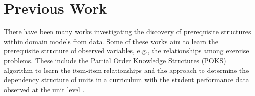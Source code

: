 \documentclass{edm_template}
\begin{document}
%


\section{Previous Work}
\label{sec:previous_work}
There have been many works investigating the discovery of prerequisite structures within domain models from data.
Some of these works aim to learn the prerequisite structure of observed variables, e.g., the relationships among exercise problems.
These include the Partial Order Knowledge Structures (POKS) algorithm \cite{desmarais2006learned, pavlik2008using} to learn the item-item relationships
and the approach to determine the dependency structure of units in a curriculum with the student performance data observed at the unit level \cite{vuong2011method}.
  
\end{document}
